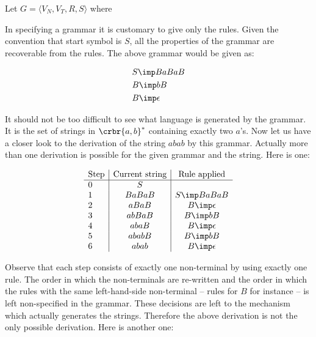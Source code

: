 \documentclass[11pt]{article}
\begin{document}
\begin{uexample}\label{exder}
Let $G = \langle V_N,V_T,R,S\rangle$ where


In specifying a grammar it is customary to give only the rules. Given the
convention that start symbol is $S$, all the properties of the grammar are
recoverable from the rules. The above grammar would be given as:

\begin{align*}
& S\imp B a B a B \\
& B\imp b B \\
& B \imp \epsilon
\end{align*}

It should not be too difficult to see what language is generated by the grammar.
It is the set of strings in $\crbr{a,b}^*$ containing exactly two $a$'s. Now let us have a closer
look to the derivation of the string $abab$ by this grammar. Actually more than
one derivation is possible for the given grammar and the string. Here is one:

\begin{align*}
\begin{array}{l|c|c}
\text{Step} & \text{Current string} & \text{Rule applied}\\  \hline
0&S & \\
1&B a B a B & S\imp B a B a B\\
2&a B a B & B \imp \epsilon\\
3&a b B a B& B \imp b B\\
4&a b a B & B\imp \epsilon\\
5&a b a b B & B\imp b B\\
6&a b a b & B \imp \epsilon\\
\end{array}
\end{align*}

Observe that each step consists of  exactly one non-terminal by
using exactly one rule. The order in which the non-terminals are re-written and
the order in which the rules with the same left-hand-side non-terminal -- rules
for $B$ for instance -- is left non-specified in the grammar. These decisions
are left to the mechanism which actually generates the strings. Therefore the
above derivation is not the only possible derivation. Here is another
one: 


\end{uexample}
\end{document}
